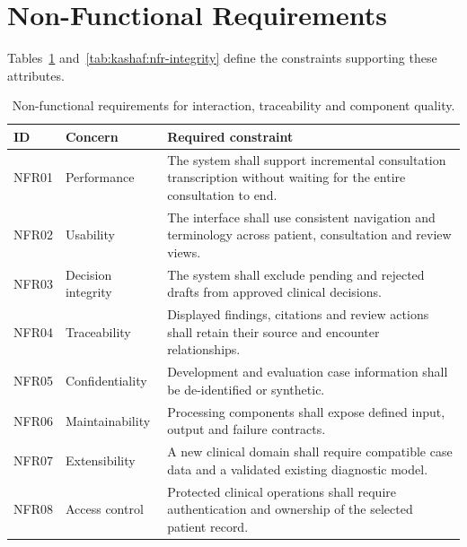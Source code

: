 \section{Non-Functional Requirements}
Tables~\ref{tab:kashaf:nfr} and~\ref{tab:kashaf:nfr-integrity} define the constraints supporting these attributes.

\begin{table}[htbp]
\centering
\small
\caption{Non-functional requirements for interaction, traceability and component quality.}
\label{tab:kashaf:nfr}
\begin{tabular}{|p{}|p{}|p{}|}
\hline
ID & Concern & Required constraint \\ \hline
NFR01 & Performance & The system shall support incremental consultation transcription without waiting for the entire consultation to end. \\ \hline
NFR02 & Usability & The interface shall use consistent navigation and terminology across patient, consultation and review views. \\ \hline
NFR03 & Decision integrity & The system shall exclude pending and rejected drafts from approved clinical decisions. \\ \hline
NFR04 & Traceability & Displayed findings, citations and review actions shall retain their source and encounter relationships. \\ \hline
NFR05 & Confidentiality & Development and evaluation case information shall be de-identified or synthetic. \\ \hline
NFR06 & Maintainability & Processing components shall expose defined input, output and failure contracts. \\ \hline
NFR07 & Extensibility & A new clinical domain shall require compatible case data and a validated existing diagnostic model. \\ \hline
NFR08 & Access control & Protected clinical operations shall require authentication and ownership of the selected patient record. \\ \hline
\end{tabular}
\end{table}

